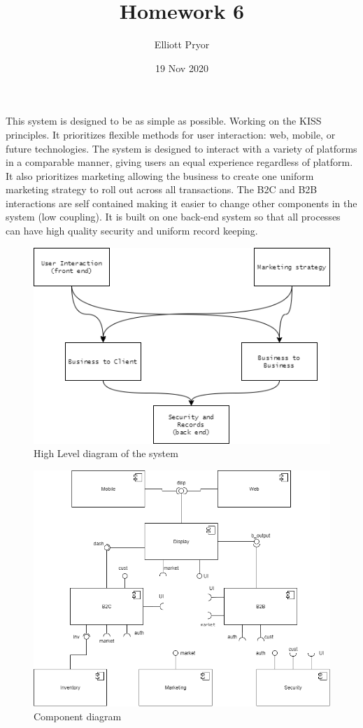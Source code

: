 \documentclass[11pt]{article}
\title{Homework 6}
\author{Elliott Pryor}
\date{19 Nov 2020}
\begin{document}
\maketitle


This system is designed to be as simple as possible. Working on the KISS principles. It prioritizes flexible methods for user interaction: web, mobile, or future technologies. 
The system is designed to interact with a variety of platforms in a comparable manner, giving users an equal experience regardless of platform.
It also prioritizes marketing allowing the business to create one uniform marketing strategy to roll out across all transactions.
The B2C and B2B interactions are self contained making it easier to change other components in the system (low coupling). 
It is built on one back-end system so that all processes can have high quality security and uniform record keeping. 

\begin{figure}[H]
    \centering
    \includegraphics[scale = 0.7]{./p1_high_level.png}
    \caption{High Level diagram of the system}
    \label{fig:high level}
\end{figure}

\newpage
{}
\begin{figure}[H]
    \centering
    \includegraphics[width = \linewidth]{./p2_component.png}
    \caption{Component diagram}
    \label{fig:component}
\end{figure}
\end{document}
